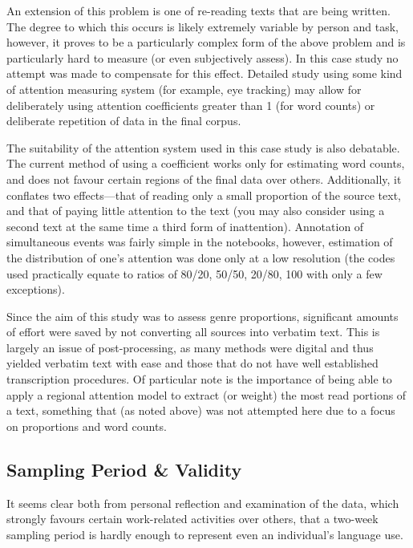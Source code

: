 An extension of this problem is one of re-reading texts that are being written.  The degree to which this occurs is likely extremely variable by person and task, however, it proves to be a particularly complex form of the above problem and is particularly hard to measure (or even subjectively assess).  In this case study no attempt was made to compensate for this effect.  Detailed study using some kind of attention measuring system (for example, eye tracking) may allow for deliberately using attention coefficients greater than 1 (for word counts) or deliberate repetition of data in the final corpus.


The suitability of the attention system used in this case study is also debatable.  The current method of using a coefficient works only for estimating word counts, and does not favour certain regions of the final data over others.  Additionally, it conflates two effects---that of reading only a small proportion of the source text, and that of paying little attention to the text (you may also consider using a second text at the same time a third form of inattention).  Annotation of simultaneous events was fairly simple in the notebooks, however, estimation of the distribution of one's attention was done only at a low resolution (the codes used practically equate to ratios of 80/20, 50/50, 20/80, 100 with only a few exceptions).





Since the aim of this study was to assess genre proportions, significant amounts of effort were saved by not converting all sources into verbatim text.  This is largely an issue of post-processing, as many methods were digital and thus yielded verbatim text with ease and those that do not have well established transcription procedures.  Of particular note is the importance of being able to apply a regional attention model to extract (or weight) the most read portions of a text, something that (as noted above) was not attempted here due to a focus on proportions and word counts.






\subsection{Sampling Period \& Validity}
It seems clear both from personal reflection and examination of the data, which strongly favours certain work-related activities over others, that a two-week sampling period is hardly enough to represent even an individual's language use.

